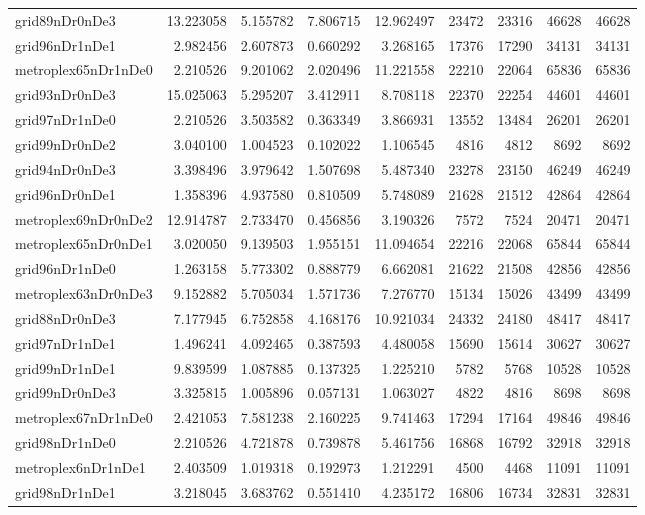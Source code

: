 \begin{longtable}{|l|r|r|r|r|r|r|r|r|}
grid89nDr0nDe3 & 13.223058 & 5.155782 & 7.806715 & 12.962497 & 23472 & 23316 & 46628 & 46628 \\
grid96nDr1nDe1 & 2.982456 & 2.607873 & 0.660292 & 3.268165 & 17376 & 17290 & 34131 & 34131 \\
metroplex65nDr1nDe0 & 2.210526 & 9.201062 & 2.020496 & 11.221558 & 22210 & 22064 & 65836 & 65836 \\
grid93nDr0nDe3 & 15.025063 & 5.295207 & 3.412911 & 8.708118 & 22370 & 22254 & 44601 & 44601 \\
grid97nDr1nDe0 & 2.210526 & 3.503582 & 0.363349 & 3.866931 & 13552 & 13484 & 26201 & 26201 \\
grid99nDr0nDe2 & 3.040100 & 1.004523 & 0.102022 & 1.106545 & 4816 & 4812 & 8692 & 8692 \\
grid94nDr0nDe3 & 3.398496 & 3.979642 & 1.507698 & 5.487340 & 23278 & 23150 & 46249 & 46249 \\
grid96nDr0nDe1 & 1.358396 & 4.937580 & 0.810509 & 5.748089 & 21628 & 21512 & 42864 & 42864 \\
metroplex69nDr0nDe2 & 12.914787 & 2.733470 & 0.456856 & 3.190326 & 7572 & 7524 & 20471 & 20471 \\
metroplex65nDr0nDe1 & 3.020050 & 9.139503 & 1.955151 & 11.094654 & 22216 & 22068 & 65844 & 65844 \\
grid96nDr1nDe0 & 1.263158 & 5.773302 & 0.888779 & 6.662081 & 21622 & 21508 & 42856 & 42856 \\
metroplex63nDr0nDe3 & 9.152882 & 5.705034 & 1.571736 & 7.276770 & 15134 & 15026 & 43499 & 43499 \\
grid88nDr0nDe3 & 7.177945 & 6.752858 & 4.168176 & 10.921034 & 24332 & 24180 & 48417 & 48417 \\
grid97nDr1nDe1 & 1.496241 & 4.092465 & 0.387593 & 4.480058 & 15690 & 15614 & 30627 & 30627 \\
grid99nDr1nDe1 & 9.839599 & 1.087885 & 0.137325 & 1.225210 & 5782 & 5768 & 10528 & 10528 \\
grid99nDr0nDe3 & 3.325815 & 1.005896 & 0.057131 & 1.063027 & 4822 & 4816 & 8698 & 8698 \\
metroplex67nDr1nDe0 & 2.421053 & 7.581238 & 2.160225 & 9.741463 & 17294 & 17164 & 49846 & 49846 \\
grid98nDr1nDe0 & 2.210526 & 4.721878 & 0.739878 & 5.461756 & 16868 & 16792 & 32918 & 32918 \\
metroplex6nDr1nDe1 & 2.403509 & 1.019318 & 0.192973 & 1.212291 & 4500 & 4468 & 11091 & 11091 \\
grid98nDr1nDe1 & 3.218045 & 3.683762 & 0.551410 & 4.235172 & 16806 & 16734 & 32831 & 32831 \\

\end{longtable}
